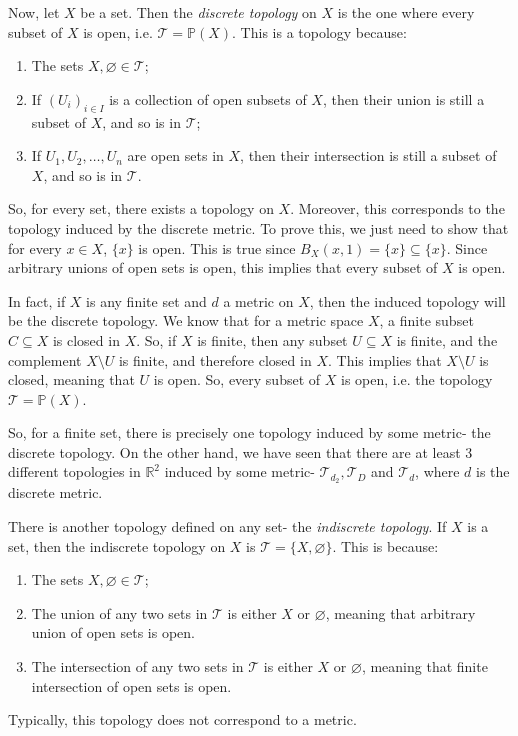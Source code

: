 \documentclass[a4paper, openany]{memoir}
\theoremstyle{definition}
\theoremstyle{plain}
\begin{document}
Now, let $X$ be a set. Then the \emph{discrete topology} on $X$ is the one where every subset of $X$ is open, i.e. $\mathcal{T} = \mathbb{P}(X)$. This is a topology because:
\begin{enumerate}[label=\textbf{T\arabic*}.]
    \item The sets $X, \varnothing \in \mathcal{T}$;
    \item If $(U_i)_{i \in I}$ is a collection of open subsets of $X$, then their union is still a subset of $X$, and so is in $\mathcal{T}$;
    \item If $U_1, U_2, \dots, U_n$ are open sets in $X$, then their intersection is still a subset of $X$, and so is in $\mathcal{T}$.
\end{enumerate}
So, for every set, there exists a topology on $X$. Moreover, this corresponds to the topology induced by the discrete metric. To prove this, we just need to show that for every $x \in X$, $\{x\}$ is open. This is true since $B_X(x, 1) = \{x\} \subseteq \{x\}$. Since arbitrary unions of open sets is open, this implies that every subset of $X$ is open.

In fact, if $X$ is any finite set and $d$ a metric on $X$, then the induced topology will be the discrete topology. We know that for a metric space $X$, a finite subset $C \subseteq X$ is closed in $X$. So, if $X$ is finite, then any subset $U \subseteq X$ is finite, and the complement $X \setminus U$ is finite, and therefore closed in $X$. This implies that $X \setminus U$ is closed, meaning that $U$ is open. So, every subset of $X$ is open, i.e. the topology $\mathcal{T} = \mathbb{P}(X)$.

So, for a finite set, there is precisely one topology induced by some metric- the discrete topology. On the other hand, we have seen that there are at least 3 different topologies in $\mathbb{R}^2$ induced by some metric- $\mathcal{T}_{d_2}, \mathcal{T}_D$ and $\mathcal{T}_d$, where $d$ is the discrete metric.

There is another topology defined on any set- the \emph{indiscrete topology}. If $X$ is a set, then the indiscrete topology on $X$ is $\mathcal{T} = \{X, \varnothing\}$. This is because:
\begin{enumerate}[label=\textbf{T\arabic*}.]
    \item The sets $X, \varnothing \in \mathcal{T}$;
    
    \item The union of any two sets in $\mathcal{T}$ is either $X$ or $\varnothing$, meaning that arbitrary union of open sets is open.
    
    \item The intersection of any two sets in $\mathcal{T}$ is either $X$ or $\varnothing$, meaning that finite intersection of open sets is open.
\end{enumerate}
Typically, this topology does not correspond to a metric. 
\end{document}
